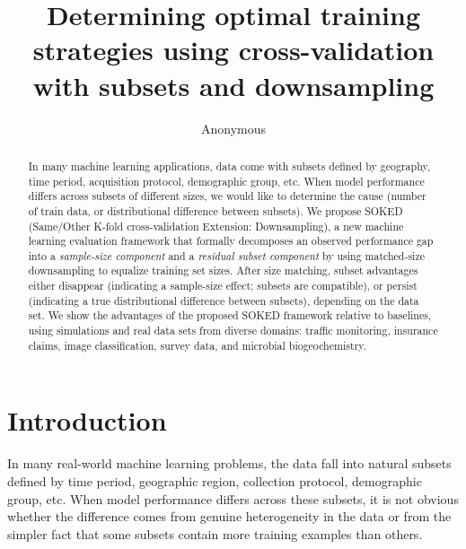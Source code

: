 \documentclass{article}
\title{Determining optimal training strategies using cross-validation with subsets and downsampling}
\author{Anonymous}
\begin{document}
\maketitle

\begin{abstract}
In many machine learning applications, data come with subsets defined by geography, time period, acquisition protocol, demographic group, etc.
When model performance differs across subsets of different sizes, we would like to determine the cause (number of train data, or distributional difference between subsets).
We propose SOKED (Same/Other K-fold cross-validation Extension: Downsampling), a new machine learning evaluation framework that formally decomposes an observed performance gap into a \emph{sample-size component} and a \emph{residual subset component} by using matched-size downsampling to equalize training set sizes.
After size matching, subset advantages either disappear (indicating a sample-size effect; subsets are compatible), or persist (indicating a true distributional difference between subsets), depending on the data set.
We show the advantages of the proposed SOKED framework relative to baselines, using simulations and real data sets from diverse domains: traffic monitoring, insurance claims, image classification, survey data, and microbial biogeochemistry.
\end{abstract}


\section{Introduction}
In many real-world machine learning problems, the data fall into natural subsets defined by time period, geographic region, collection protocol, demographic group, etc.
When model performance differs across these subsets, it is not obvious whether the difference comes from genuine heterogeneity in the data or from the simpler fact that some subsets contain more training examples than others.
\end{document}
